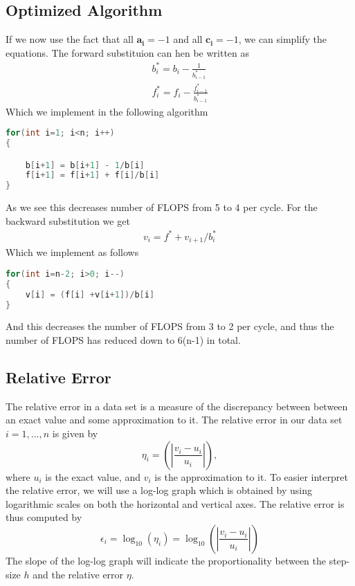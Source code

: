 \documentclass[12pt]{article}
\numberwithin{equation}{section}     %
\begin{document}
\subsection{Optimized Algorithm}
If we now use the fact that all $\boldsymbol{a_{i}}=-1$ and all $\boldsymbol{c_{i}}=-1$, we can simplify the equations. The forward substituion can hen be written as
\begin{align*}
    b^{*}_{i}=b_{i}- \frac{1}{b_{i-1}^{*}}
    \\
    f^{*}_{i}=f_{i}- \frac{f_{i-1}^{*}}{b_{i-1}^{*}}
\end{align*}
Which we implement in the following algorithm
\begin{lstlisting}[language=c++]
for(int i=1; i<n; i++)
{

    b[i+1] = b[i+1] - 1/b[i]
    f[i+1] = f[i+1] + f[i]/b[i]
}
\end{lstlisting}
As we see this decreases number of FLOPS from 5 to 4 per cycle. For the backward substitution we get
\begin{align*}
    v_{i}=f^{*}+v_{i+1}/b^{*}_{i}
\end{align*}
Which we implement as follows
\begin{lstlisting}[language=c++]
for(int i=n-2; i>0; i--)
{
    v[i] = (f[i] +v[i+1])/b[i]
}
\end{lstlisting}
And this decreases the number of FLOPS from 3 to 2 per cycle, and thus the number of FLOPS has reduced down to 6(n-1) in total.

\subsection{Relative Error}
The relative error in a data set is a measure of the discrepancy between between an exact value and some approximation to it. The relative error in our data set $i=1, ..., n$ is given by
\begin{equation}\label{eq:error}
\eta_i = \left(\left| \frac{v_i - u_i}{u_i} \right| \right),
\end{equation}
where $u_i$ is the exact value, and $v_i$ is the approximation to it. To easier interpret the relative error, we will use a log-log graph which is obtained by using logarithmic scales on both the horizontal and vertical axes. The relative error is thus computed by
\begin{equation}
    \epsilon_i = \log_{10} \left(\eta_i\right) = \log_{10} \left(\left| \frac{v_i - u_i}{u_i} \right| \right)
\end{equation}
The slope of the log-log graph will indicate the proportionality between the step-size $h$ and the relative error $\eta$.
\end{document}
